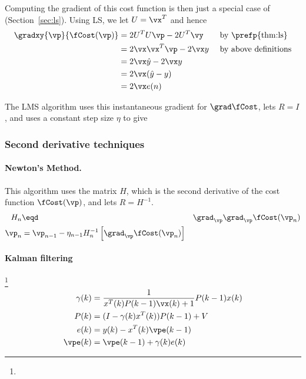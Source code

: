 Computing the gradient of this cost function is then
just a special case of  (Section~\ref{sec:ls}).
Using LS, we let $U=\vx^T$ and hence
\begin{align*}
   \gradxy{\vp}{\fCost(\vp)}
   &= 2U^TU \vp -2U^T\vy                   && \text{ by \prefp{thm:ls}}
\\ &= 2\vx\vx^T \vp -2\vx y               && \text{ by above definitions}
\\ &= 2\vx\hat{y} -2\vx y                    && \text{ }
\\ &= 2\vx(\hat{y} -y)                      && \text{ }
\\ &= 2\vx e(n)                && \text{ }
\end{align*}

The LMS algorithm uses this instantaneous gradient for $\grad\fCost$,
lets $R=I$, and uses a constant step size $\eta$ to give
\subsubsection*{Second derivative techniques}
\paragraph{Newton's Method.}
This algorithm uses the  matrix $H$,
which is the second derivative of the cost function $\fCost(\vp)$,
and lets $R=H^{-1}$.
\begin{align*}
   H_n &\eqd& \grad_\vp\grad_\vp \fCost(\vp_n)
\\
   \vp_n &= \vp_{n-1} - \eta_{n-1} H_n^{-1} \left[\grad_\vp\fCost(\vp_n)\right]
\end{align*}


\paragraph{Kalman filtering}\footnote{}
\begin{align*}
   \gamma(k) &= \frac{1}{x^T(k)P(k-1)\vx(k)+1}P(k-1)x(k) \\
   P(k) &= (I-\gamma(k)x^T(k))P(k-1)+V \\
   e(k) &= y(k) - x^T(k)\vpe(k-1) \\
   \vpe(k) &= \vpe(k-1) + \gamma(k)e(k)
\end{align*}

